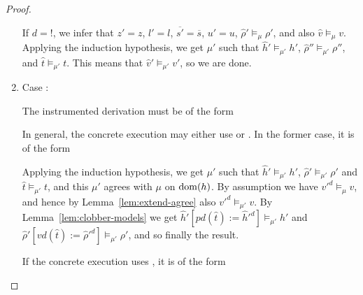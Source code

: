 \documentclass{article}
\begin{document}
\begin{proof}
\begin{enumerate}
  If $d=!$, we infer that $z'=z$, $l'=l$, $\overline{s'}=\overline{s}$, $u'=u$, $\hat{\rho}'\models_{\mu}\rho'$, and also $\hat{v}\models_{\mu}v$. Applying the induction hypothesis, we get $\mu'$ such that $\hat{h}'\models_{\mu'}h'$, $\hat{\rho}''\models_{\mu'}\rho''$, and $\hat{t}\models_{\mu'}t$. This means that $\hat{v}'\models_{\mu'}v'$, so we are done.
  
\item Case :

  The instrumented derivation must be of the form

  \begin{prooftree}
     
  \end{prooftree}

  In general, the concrete execution may either use  or . In the former case, it is of the form

  \begin{prooftree}
  \end{prooftree}

  Applying the induction hypothesis, we get $\mu'$ such that $\hat{h}'\models_{\mu'}h'$, $\hat{\rho}'\models_{\mu'}\rho'$ and $\hat{t}\models_{\mu'}t$, and this $\mu'$ agrees with $\mu$ on $\dom(h)$. By assumption we have $v'^d\models_{\mu}v$, and hence by Lemma~\ref{lem:extend-agree} also $v'^d\models_{\mu'}v$. By Lemma~\ref{lem:clobber-models} we get $\hat{h}'[\mathit{pd}(\hat{t}):=\hat{h}'^d]\models_{\mu'}h'$ and $\hat{\rho}'[\mathit{vd}(\hat{t}):=\hat{\rho}'^d]\models_{\mu'}\rho'$, and so finally the result.

  If the concrete execution uses , it is of the form

  \begin{prooftree}
  \end{prooftree}


\end{enumerate}
\end{proof}
\end{document}
